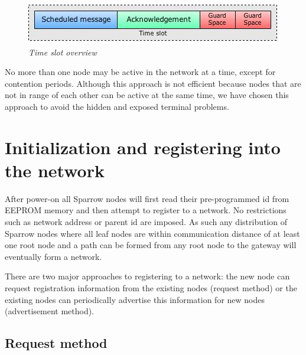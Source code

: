 \begin{figure}[ht]
	\begin{center}
		\includegraphics[width=\textwidth]{img/time_slot.jpg}
	\end{center}
	\caption{\small \itshape{Time slot overview}}
\end{figure}

No more than one node may be active in the network at a time, except for
contention periods. Although this approach is not efficient because nodes that
are not in range of each other can be active at the same time, we have chosen
this approach to avoid the hidden and exposed terminal problems. 

\section{Initialization and registering into the network}
\label{sec:initialization_and_registering_into_the_network}

After power-on all Sparrow nodes will first read their pre-programmed id from
\mbox{EEPROM} memory and then attempt to register to a network. No restrictions
such as network address or parent id are imposed. As such any distribution of
Sparrow nodes where all leaf nodes are within communication distance of at
least one root node and a path can be formed from any root node to the gateway
will eventually form a network. 

There are two major approaches to registering to a network: the new node can
request registration information from the existing nodes (request method) or
the existing nodes can periodically advertise this information for new nodes
(advertisement method). 

\subsection{Request method}

